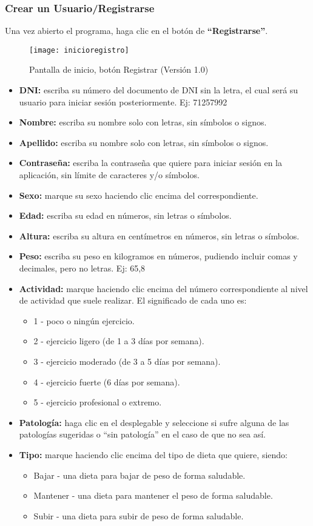 \subsubsection{Crear un Usuario/Registrarse}
Una vez abierto el programa, haga clic en el botón de \textbf{“Registrarse”}. 
\begin{figure}[htb]
\centering
\texttt{[image: inicioregistro]} 
\caption{Pantalla de inicio, botón Registrar (Versión 1.0)}
\end{figure}

\begin{itemize}
\item	\textbf{DNI:} escriba su número del documento de DNI sin la letra, el cual será su usuario para iniciar sesión posteriormente. Ej: 71257992
\item	\textbf{Nombre:} escriba su nombre solo con letras, sin símbolos o signos.
\item	\textbf{Apellido:} escriba su nombre solo con letras, sin símbolos o signos.
\item	\textbf{Contraseña:} escriba la contraseña que quiere para iniciar sesión en la aplicación, sin límite de caracteres y/o símbolos.
\item	\textbf{Sexo:} marque su sexo haciendo clic encima del correspondiente.
\item	\textbf{Edad:} escriba su edad en números, sin letras o símbolos.
\item	\textbf{Altura:} escriba su altura en centímetros en números, sin letras o símbolos.
\item	\textbf{Peso:} escriba su peso en kilogramos en números, pudiendo incluir comas y decimales, pero no letras. Ej: 65,8
\item	\textbf{Actividad:} marque haciendo clic encima del número correspondiente al nivel de actividad que suele realizar. El significado de cada uno es:
\begin{itemize}
\item	1 - poco o ningún ejercicio.
\item	2 - ejercicio ligero (de 1 a 3 días por semana).
\item	3 - ejercicio moderado (de 3 a 5 días por semana).
\item	4 - ejercicio fuerte (6 días por semana).
\item	5 - ejercicio profesional o extremo.
\end{itemize}
\item	\textbf{Patología:} haga clic en el desplegable y seleccione si sufre alguna de las patologías sugeridas o “sin patología” en el caso de que no sea así.
\item	\textbf{Tipo:} marque haciendo clic encima del tipo de dieta que quiere, siendo:
\begin{itemize}
\item	Bajar - una dieta para bajar de peso de forma saludable.
\item	Mantener - una dieta para mantener el peso de forma saludable.
\item	Subir - una dieta para subir de peso de forma saludable.
\end{itemize}
\end{itemize}

